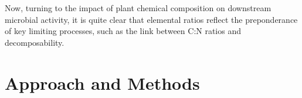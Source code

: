 Now, turning to the impact of plant chemical composition on downstream microbial activity, it is quite clear that elemental ratios reflect the preponderance of key limiting processes, such as the link between C:N ratios and decomposability. 





\section{Approach and Methods}



